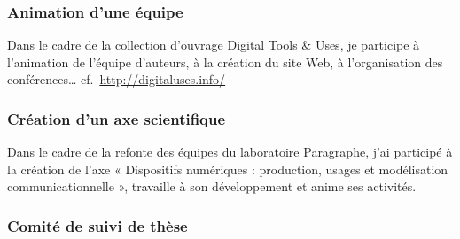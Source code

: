 \documentclass[
  a4paper,
  DIV=11,
  numbers=noendperiod]{scrreprt}
\begin{document}
\subsubsection{Animation d'une équipe}\label{sec-item299366}

Dans le cadre de la collection d'ouvrage Digital Tools \& Uses, je
participe à l'animation de l'équipe d'auteurs, à la création du site
Web, à l'organisation des conférences\ldots{}
cf.~\url{http://digitaluses.info/}

\subsubsection{Création d'un axe scientifique}\label{sec-item299364}

Dans le cadre de la refonte des équipes du laboratoire Paragraphe, j'ai
participé à la création de l'axe « Dispositifs numériques : production,
usages et modélisation communicationnelle », travaille à son
développement et anime ses activités.

\subsubsection{Comité de suivi de thèse}\label{sec-item299642}
\end{document}
